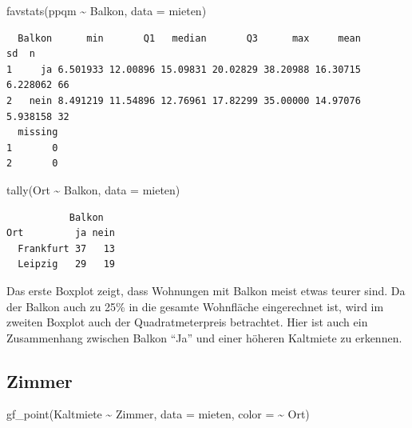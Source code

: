 \documentclass[
  a4paper,
  DIV=11]{scrartcl}
\newenvironment{Shaded}{\begin{snugshade}}{\end{snugshade}}
\newcommand{\AttributeTok}[1]{\textcolor[rgb]{0.40,0.45,0.13}{#1}}
\newcommand{\FunctionTok}[1]{\textcolor[rgb]{0.28,0.35,0.67}{#1}}
\newcommand{\NormalTok}[1]{\textcolor[rgb]{0.00,0.23,0.31}{#1}}
\newcommand{\SpecialCharTok}[1]{\textcolor[rgb]{0.37,0.37,0.37}{#1}}
\begin{document}
\begin{Shaded}
\begin{Highlighting}[]
\FunctionTok{favstats}\NormalTok{(ppqm }\SpecialCharTok{\textasciitilde{}}\NormalTok{ Balkon, }\AttributeTok{data =}\NormalTok{ mieten)}
\end{Highlighting}
\end{Shaded}

\begin{verbatim}
  Balkon      min       Q1   median       Q3      max     mean       sd  n
1     ja 6.501933 12.00896 15.09831 20.02829 38.20988 16.30715 6.228062 66
2   nein 8.491219 11.54896 12.76961 17.82299 35.00000 14.97076 5.938158 32
  missing
1       0
2       0
\end{verbatim}

\begin{Shaded}
\begin{Highlighting}[]
\FunctionTok{tally}\NormalTok{(Ort }\SpecialCharTok{\textasciitilde{}}\NormalTok{ Balkon, }\AttributeTok{data =}\NormalTok{ mieten)}
\end{Highlighting}
\end{Shaded}

\begin{verbatim}
           Balkon
Ort         ja nein
  Frankfurt 37   13
  Leipzig   29   19
\end{verbatim}

Das erste Boxplot zeigt, dass Wohnungen mit Balkon meist etwas teurer
sind. Da der Balkon auch zu 25\% in die gesamte Wohnfläche eingerechnet
ist, wird im zweiten Boxplot auch der Quadratmeterpreis betrachtet. Hier
ist auch ein Zusammenhang zwischen Balkon ``Ja'' und einer höheren
Kaltmiete zu erkennen.

\hypertarget{zimmer}{%
\subsection{Zimmer}\label{zimmer}}

\begin{Shaded}
\begin{Highlighting}[]
\FunctionTok{gf\_point}\NormalTok{(Kaltmiete }\SpecialCharTok{\textasciitilde{}}\NormalTok{ Zimmer, }\AttributeTok{data =}\NormalTok{ mieten, }\AttributeTok{color =} \SpecialCharTok{\textasciitilde{}}\NormalTok{ Ort)}
\end{Highlighting}
\end{Shaded}
\end{document}

